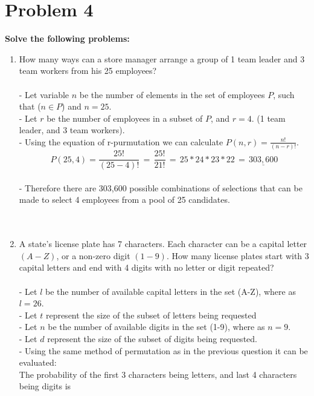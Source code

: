\documentclass{amsart}
\theoremstyle{definition}
\theoremstyle{Exercise}
\theoremstyle{remark}
\theoremstyle{rule}
\numberwithin{equation}{section}
\begin{document}
  \section*{Problem 4}
  {\bf Solve the following problems:}
  \begin{enumerate}[label=(\alph*)]
    \item How many ways can a store manager arrange a group of 1 team leader and 3 team workers from his 25 employees?
\\\\
  - Let variable $n$ be the number of elements in the set of employees $P$, such  that ($n \in P$) and $n = 25$.\\
  - Let $r$ be the number of employees in a subset of $P$, and $r = 4$. (1 team leader, and 3 team workers).\\
  - Using the equation of r-purmutation we can calculate $P(n, r) = \frac{n!}{(n-r)!}$.\\
  $$P(25,4) = \frac{25!}{(25-4)!} \,=\, \frac{25!}{21!} \,=\, 25*24*23*22 \,=\, \underline{303,600}$$\\
  - Therefore there are 303,600 possible combinations of selections that can be made to select 4 employees from a pool of 25 candidates.\\ 
\\\\
    \item A state’s license plate has 7 characters. Each character can be a capital letter $(A-Z)$, or a non-zero digit $(1-9)$. How many license plates start with 3 capital letters and end with 4 digits with no letter or digit repeated?
\\\\
  - Let $l$ be the number of available capital letters in the set (A-Z), where as $l = 26$.\\
  - Let $t$ represent the size of the subset of letters being requested\\
  - Let $n$ be the number of available digits in the set (1-9), where as $n = 9$.\\
  - Let $d$ represent the size of the subset of digits being requested.\\
  - Using the same method of permutation as in the previous question it can be evaluated:\\
  The probability of the first 3 characters being letters, and last 4 characters being digits is\\
  \\\\

\end{enumerate}
\end{document}

